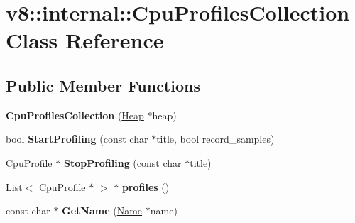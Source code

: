 \hypertarget{classv8_1_1internal_1_1_cpu_profiles_collection}{}\section{v8\+:\+:internal\+:\+:Cpu\+Profiles\+Collection Class Reference}
\label{classv8_1_1internal_1_1_cpu_profiles_collection}
\subsection*{Public Member Functions}
\begin{DoxyCompactItemize}
\item 
{\bfseries Cpu\+Profiles\+Collection} (\hyperlink{classv8_1_1internal_1_1_heap}{Heap} $\ast$heap)\hypertarget{classv8_1_1internal_1_1_cpu_profiles_collection_a61625974306812831897143ea5dc3e0e}{}\label{classv8_1_1internal_1_1_cpu_profiles_collection_a61625974306812831897143ea5dc3e0e}

\item 
bool {\bfseries Start\+Profiling} (const char $\ast$title, bool record\+\_\+samples)\hypertarget{classv8_1_1internal_1_1_cpu_profiles_collection_a3b3d660ce79d37aba5ba7479d2f03f2b}{}\label{classv8_1_1internal_1_1_cpu_profiles_collection_a3b3d660ce79d37aba5ba7479d2f03f2b}

\item 
\hyperlink{classv8_1_1internal_1_1_cpu_profile}{Cpu\+Profile} $\ast$ {\bfseries Stop\+Profiling} (const char $\ast$title)\hypertarget{classv8_1_1internal_1_1_cpu_profiles_collection_ae11f54582389f8e972760151438df330}{}\label{classv8_1_1internal_1_1_cpu_profiles_collection_ae11f54582389f8e972760151438df330}

\item 
\hyperlink{classv8_1_1internal_1_1_list}{List}$<$ \hyperlink{classv8_1_1internal_1_1_cpu_profile}{Cpu\+Profile} $\ast$ $>$ $\ast$ {\bfseries profiles} ()\hypertarget{classv8_1_1internal_1_1_cpu_profiles_collection_a891193b036afc4dd4f032fa4088b9916}{}\label{classv8_1_1internal_1_1_cpu_profiles_collection_a891193b036afc4dd4f032fa4088b9916}

\item 
const char $\ast$ {\bfseries Get\+Name} (\hyperlink{classv8_1_1internal_1_1_name}{Name} $\ast$name)\hypertarget{classv8_1_1internal_1_1_cpu_profiles_collection_a3013fbd52896673bb93ec1ed8f5a4e01}{}\label{classv8_1_1internal_1_1_cpu_profiles_collection_a3013fbd52896673bb93ec1ed8f5a4e01}


\end{DoxyCompactItemize}
